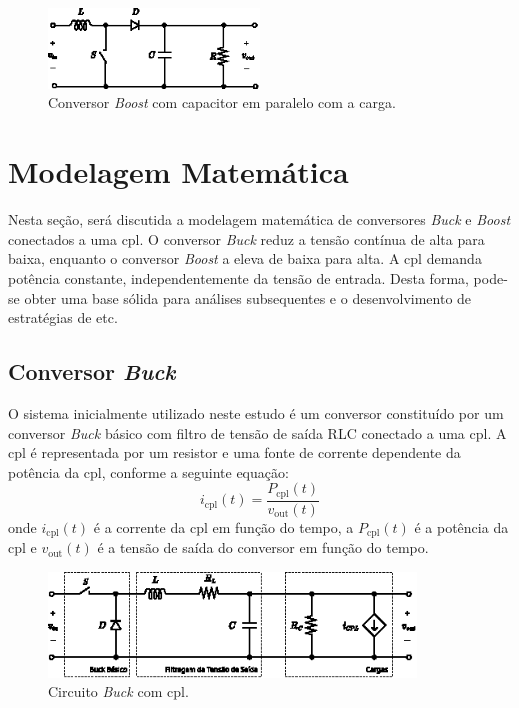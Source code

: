 \begin{figure}[H]
  \centering
  \includegraphics[width=0.5\textwidth]{figuras/boost_converter_capacitor.eps}
  \caption{Conversor \textit{Boost} com capacitor em paralelo com a carga.}
  \label{fig:boost_converter_capacitor}
\end{figure}

\section{Modelagem Matemática}

Nesta seção, será discutida a modelagem matemática de conversores \textit{Buck} e \textit{Boost} conectados a uma \acrshort{cpl}. O conversor \textit{Buck} reduz a tensão contínua de alta para baixa, enquanto o conversor \textit{Boost} a eleva de baixa para alta. A \acrshort{cpl} demanda potência constante, independentemente da tensão de entrada. Desta forma, pode-se obter uma base sólida para análises subsequentes e o desenvolvimento de estratégias de \acrshort{etc}.

\subsection{Conversor \textit{Buck}}

O sistema inicialmente utilizado neste estudo é um conversor constituído por um conversor \textit{Buck} básico com filtro de tensão de saída RLC conectado a uma \acrshort{cpl}. A \acrshort{cpl} é representada por um resistor e uma fonte de corrente dependente da potência da \acrshort{cpl}, conforme a seguinte equação: \begin{equation} i_{\mathrm{cpl}}(t) = \frac{P_{\mathrm{cpl}}(t)}{v_{\mathrm{out}}(t)} \label{eq:cpl_current} \end{equation} onde $i_{\mathrm{cpl}}(t)$ é a corrente da \acrshort{cpl} em função do tempo, a $P_{\mathrm{cpl}}(t)$ é a potência da \acrshort{cpl} e $v_{\mathrm{out}}(t)$ é a tensão de saída do conversor em função do tempo.

\begin{figure}[H]
  \centering
  \captionsetup{justification=centering}
  \includegraphics[width=0.87\textwidth]{figuras/buck_converter_circuit.eps}
  \caption{Circuito \textit{Buck} com \acrshort{cpl}.}
  \label{fig:circuit1}
\end{figure}

